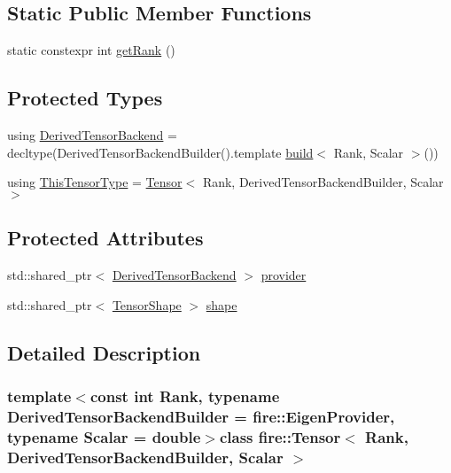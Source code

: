 \subsection*{Static Public Member Functions}
\begin{DoxyCompactItemize}
\item 
static constexpr int \hyperlink{a00046_a42da4c71f8574b8d82c19fd8e398ae15}{get\+Rank} ()
\end{DoxyCompactItemize}
\subsection*{Protected Types}
\begin{DoxyCompactItemize}
\item 
using \hyperlink{a00046_a2bee8cbb535647595a650d9a48edb509}{Derived\+Tensor\+Backend} = decltype(Derived\+Tensor\+Backend\+Builder().template \hyperlink{a00103_abca66b4f2a1543308b663714bd8b4855}{build}$<$ Rank, Scalar $>$())
\item 
using \hyperlink{a00046_ac86105ceb5e209854b2554a755024bd4}{This\+Tensor\+Type} = \hyperlink{a00046}{Tensor}$<$ Rank, Derived\+Tensor\+Backend\+Builder, Scalar $>$
\end{DoxyCompactItemize}
\subsection*{Protected Attributes}
\begin{DoxyCompactItemize}
\item 
std\+::shared\+\_\+ptr$<$ \hyperlink{a00046_a2bee8cbb535647595a650d9a48edb509}{Derived\+Tensor\+Backend} $>$ \hyperlink{a00046_adffb886fa5e4d9f0ffcb980af3173bd4}{provider}
\item 
std\+::shared\+\_\+ptr$<$ \hyperlink{a00048}{Tensor\+Shape} $>$ \hyperlink{a00046_ab35d7a07696ced19cb5f0cebb6406ce4}{shape}
\end{DoxyCompactItemize}


\subsection{Detailed Description}
\subsubsection*{template$<$const int Rank, typename Derived\+Tensor\+Backend\+Builder = fire\+::\+Eigen\+Provider, typename Scalar = double$>$class fire\+::\+Tensor$<$ Rank, Derived\+Tensor\+Backend\+Builder, Scalar $>$}

